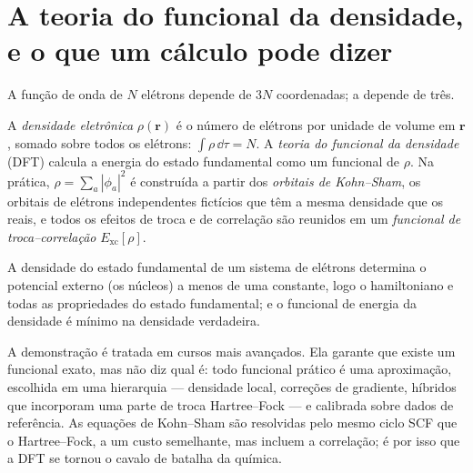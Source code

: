 \section{A teoria do funcional da densidade, e o que um cálculo pode dizer}

A função de onda de $N$ elétrons depende de $3N$ coordenadas; a  depende de três.

\begin{definition}\label{def:b3:computational-chemistry:dft}
A \emph{densidade eletrônica} $\rho(\mathbf r)$ é o
número de elétrons por unidade de volume em $\mathbf r$, somado sobre todos os elétrons:
$\int\rho\,\dd\tau = N$. A \emph{teoria do funcional da densidade}
(DFT) calcula a energia do estado fundamental como um funcional de $\rho$. Na
prática, $\rho = \sum_a|\phi_a|^2$ é construída a partir dos \emph{orbitais de
Kohn--Sham}, os orbitais de elétrons independentes
fictícios que têm a mesma densidade que os reais, e todos os efeitos de troca
e de correlação são reunidos em um \emph{funcional de
troca--correlação} $E_{\mathrm{xc}}[\rho]$.
\end{definition}

\begin{theorem}\label{thm:b3:computational-chemistry:hohenberg-kohn}
A densidade do estado fundamental de um sistema de elétrons determina o
potencial externo (os núcleos) a menos de uma constante, logo o hamiltoniano e
todas as propriedades do estado fundamental; e o funcional de energia da
densidade é mínimo na densidade verdadeira.
\end{theorem}
\admitted

A demonstração é tratada em cursos mais avançados. Ela garante que existe um
funcional exato, mas não diz qual é: todo funcional prático é uma
aproximação, escolhida em uma hierarquia --- densidade local, correções de
gradiente, híbridos que incorporam uma parte de troca Hartree--Fock --- e
calibrada sobre dados de referência. As equações de Kohn--Sham são resolvidas
pelo mesmo ciclo SCF que o Hartree--Fock, a um custo semelhante, mas incluem a
correlação; é por isso que a DFT se tornou o cavalo de batalha da química.

